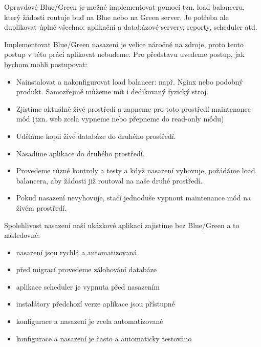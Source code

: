 Opravdové Blue/Green je možné implementovat pomocí tzn. load balanceru, který žádosti routuje buď na Blue nebo na Green server. Je potřeba ale duplikovat úplně všechno: aplikační a databázové servery, reporty, scheduler atd.

Implementovat Blue/Green nasazení je velice náročné na zdroje, proto tento postup v této práci aplikovat nebudeme. Pro představu uvedeme postup, jak bychom mohli postupovat:

\begin{itemize}
\item Nainstalovat a nakonfigurovat load balancer: např. Nginx nebo podobný produkt. Samozřejmě můžeme mít i dedikovaný fyzický stroj.
\item Zjistíme aktuálně živé prostředí a zapneme pro toto prostředí maintenance mód (tzn. web zcela vypneme nebo přepneme do read-only módu)
\item Uděláme kopii živé databáze do druhého prostředí.
\item Nasadíme aplikace do druhého prostředí.
\item Provedeme různé kontroly a testy a když nasazení vyhovuje, požádáme load balancera, aby žádosti již routoval na naše druhé prostředí.
\item Pokud nasazení nevyhovuje, stačí jednoduše vypnout maintenance mód na živém prostředí.
\end{itemize}

Spolehlivost nasazení naší ukázkové aplikaci zajistíme bez Blue/Green a to následovně:

\begin{itemize}
\item nasazení jsou rychlá a automatizovaná
\item před migrací provedeme zálohování databáze
\item aplikace scheduler je vypnuta před nasazením
\item instalátory předchozí verze aplikace jsou přístupné 
\item konfigurace a nasazení je zcela automatizované
\item konfigurace a nasazení je často a automaticky testováno
\end{itemize}

